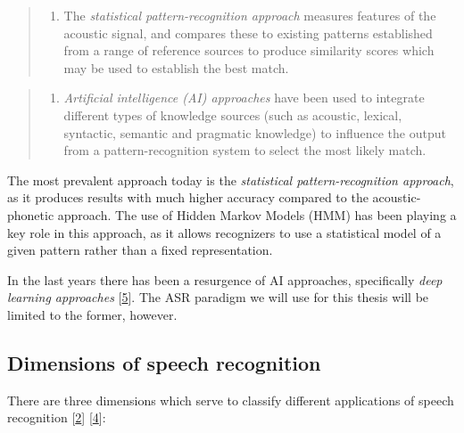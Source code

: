 \documentclass[]{article}
\providecommand{\tightlist}{%
  \setlength{\itemsep}{0pt}\setlength{\parskip}{0pt}}
\begin{document}
\begin{quote}
\begin{enumerate}
\def\labelenumi{\arabic{enumi}.}
\setcounter{enumi}{1}
\tightlist
\item
  The \emph{statistical pattern-recognition approach} measures features
  of the acoustic signal, and compares these to existing patterns
  established from a range of reference sources to produce similarity
  scores which may be used to establish the best match.
\end{enumerate}
\end{quote}

\begin{quote}
\begin{enumerate}
\def\labelenumi{\arabic{enumi}.}
\setcounter{enumi}{2}
\tightlist
\item
  \emph{Artificial intelligence (AI) approaches} have been used to
  integrate different types of knowledge sources (such as acoustic,
  lexical, syntactic, semantic and pragmatic knowledge) to influence the
  output from a pattern-recognition system to select the most likely
  match.
\end{enumerate}
\end{quote}

The most prevalent approach today is the \emph{statistical
pattern-recognition approach}, as it produces results with much higher
accuracy compared to the acoustic-phonetic approach. The use of Hidden
Markov Models (HMM) has been playing a key role in this approach, as it
allows recognizers to use a statistical model of a given pattern rather
than a fixed representation.

In the last years there has been a resurgence of AI approaches,
specifically \emph{deep learning approaches}
{[}\hyperref[ref-hinton2012deep]{5}{]}. The ASR paradigm we will use for
this thesis will be limited to the former, however.

\subsection{Dimensions of speech
recognition}\label{dimensions-of-speech-recognition}

There are three dimensions which serve to classify different
applications of speech recognition {[}\hyperref[ref-cmufaq]{2}{]}
{[}\hyperref[ref-marquard]{4}{]}:
\end{document}
